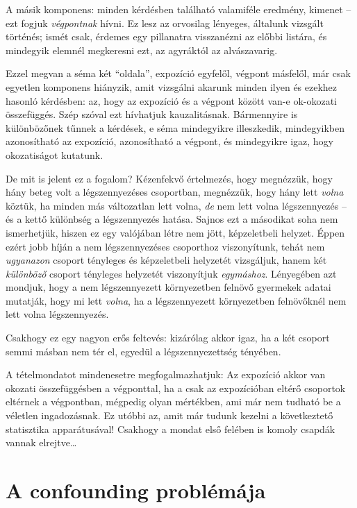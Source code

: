 \documentclass[magyar,]{book}
\begin{document}
A másik komponens: minden kérdésben található valamiféle eredmény, kimenet -- ezt fogjuk \emph{végpontnak} hívni. Ez lesz az orvosilag lényeges, általunk vizsgált történés; ismét csak, érdemes egy pillanatra visszanézni az előbbi listára, és mindegyik elemnél megkeresni ezt, az agyráktól az alvászavarig.

Ezzel megvan a séma két \enquote{oldala}, expozíció egyfelől, végpont másfelől, már csak egyetlen komponens hiányzik, amit vizsgálni akarunk minden ilyen és ezekhez hasonló kérdésben: az, hogy az expozíció és a végpont között van-e ok-okozati összefüggés. Szép szóval ezt hívhatjuk kauzalitásnak. Bármennyire is különbözőnek tűnnek a kérdések, e séma mindegyikre illeszkedik, mindegyikben azonosítható az expozíció, azonosítható a végpont, és mindegyikre igaz, hogy okozatiságot kutatunk.

De mit is jelent ez a fogalom? Kézenfekvő értelmezés, hogy megnézzük, hogy hány beteg volt a légszennyezéses csoportban, megnézzük, hogy hány lett \emph{volna} köztük, ha minden más változatlan lett volna, \emph{de} nem lett volna légszennyezés -- és a kettő különbség a légszennyezés hatása. Sajnos ezt a másodikat soha nem ismerhetjük, hiszen ez egy valójában létre nem jött, képzeletbeli helyzet. Éppen ezért jobb híján a nem légszennyezéses csoporthoz viszonyítunk, tehát nem \emph{ugyanazon} csoport tényleges és képzeletbeli helyzetét vizsgáljuk, hanem két \emph{különböző} csoport tényleges helyzetét viszonyítjuk \emph{egymáshoz}. Lényegében azt mondjuk, hogy a nem légszennyezett környezetben felnövő gyermekek adatai mutatják, hogy mi lett \emph{volna}, ha a légszennyezett környezetben felnövőknél nem lett volna légszennyezés.

Csakhogy ez egy nagyon erős feltevés: kizárólag akkor igaz, ha a két csoport semmi másban nem tér el, egyedül a légszennyezettség tényében.

A tételmondatot mindenesetre megfogalmazhatjuk: Az expozíció akkor van okozati összefüggésben a végponttal, ha a csak az expozícióban eltérő csoportok eltérnek a végpontban, mégpedig olyan mértékben, ami már nem tudható be a véletlen ingadozásnak. Ez utóbbi az, amit már tudunk kezelni a következtető statisztika apparátusával! Csakhogy a mondat első felében is komoly csapdák vannak elrejtve\ldots{}

\hypertarget{a-confounding-probluxe9muxe1ja}{%
\section{A confounding problémája}\label{a-confounding-probluxe9muxe1ja}}
\end{document}
